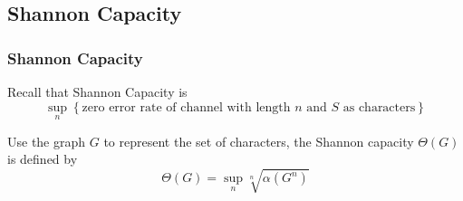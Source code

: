 \subsection{Shannon Capacity}

      \begin{frame}
            \frametitle{Shannon Capacity}
            \begin{definition}\label{def:shannonCapacity}
                  Recall that Shannon Capacity is 
                  \begin{equation}
                        \sup_{n} \left\{
                              \text{zero error rate of channel with length $n$ and $S$ as characters}
                        \right\}
                  \end{equation}

                  Use the graph $G$ to represent the set of characters, the Shannon capacity $ \Theta(G) $ is defined by
                  \begin{equation}
                        \Theta(G) = \sup_{n} \sqrt[n]{\alpha(G^n)} 
                  \end{equation}

            \end{definition}
      \end{frame}

